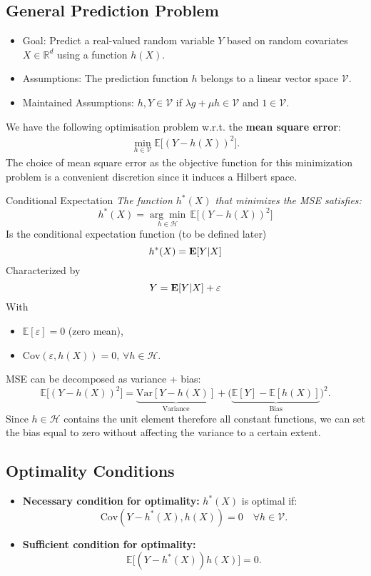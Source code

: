 \subsection{General Prediction Problem}
\begin{itemize}
    \item Goal: Predict a real-valued random variable $Y$ based on random covariates $X \in \mathbb{R}^d$ using a function $h(X)$.
    \item Assumptions: The prediction function $h$ belongs to a linear vector space $\mathcal{V}$. 
    \item Maintained Assumptions: $h, Y \in \mathcal{V}$ if $\lambda g + \mu h \in \mathcal{V}$ and $1 \in \mathcal{V}$.
\end{itemize}
We have the following optimisation problem w.r.t. the \textbf{mean square error}: 
\begin{align*}
\min_{h \in \mathcal{V}} \mathbb{E} \big[ (Y - h(X))^2 \big].
\end{align*}
The choice of mean square error as the objective function for this minimization problem is a convenient discretion since it induces a Hilbert space. 

\begin{thm}{Conditional Expectation}
\textit{The function $h^*(X)$ that minimizes the MSE satisfies:}
\[
h^*(X) = \underset{h \in \mathscr{H}}{\arg \min} \, \mathbb{E} \big[ (Y - h(X))^2 \big]
\]
Is the conditional expectation function (to be defined later)
$$h^*(X) = \vb{E}[Y|X]$$
Characterized by 
$$Y = \vb{E}[Y|X] + {\varepsilon}$$
With
\begin{itemize}
    \item $\mathbb{E}[\varepsilon] = 0$ (zero mean),
    \item $\text{Cov}(\varepsilon, h(X)) = 0, \, \forall h \in \mathscr{H}$.
\end{itemize}	
\end{thm}

\begin{rmk}
MSE can be decomposed as variance + bias:
\[
\mathbb{E} \big[ (Y - h(X))^2 \big] = \underbrace{\text{Var}[Y - h(X)]}_{\text{Variance}} + \big( \underbrace{\mathbb{E}[Y] - \mathbb{E}[h(X)]}_{\text{Bias}} \big)^2.
\]
Since $h\in \mathscr{H}$ contains the unit element therefore all constant functions, we can set the bias equal to zero without affecting the variance to a certain extent. 
\end{rmk}

\subsection{Optimality Conditions}
\begin{itemize}
    \item \textbf{Necessary condition for optimality:} $h^*(X)$ is optimal if:
    \[
    \text{Cov}(Y - h^*(X), h(X)) = 0 \quad \forall h \in \mathcal{V}.
    \]
    \item \textbf{Sufficient condition for optimality:}
    \[
    \mathbb{E} \big[ (Y - h^*(X)) h(X) \big] = 0.
    \]
\end{itemize}

